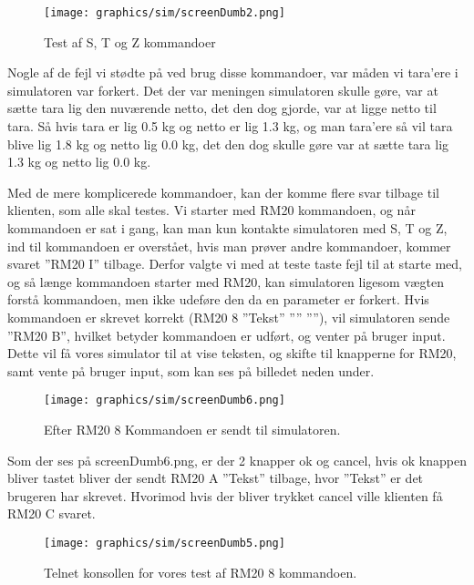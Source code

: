 \documentclass[a4paper]{article}
\newenvironment{changemargin}[2]{%
\begin{list}{}{%
\setlength{\topsep}{0pt}%
\setlength{\leftmargin}{#1}%
\setlength{\rightmargin}{#2}%
\setlength{\listparindent}{\parindent}%
\setlength{\itemindent}{\parindent}%
\setlength{\parsep}{\parskip}%
}%
\item[]}{\end{list}}
\begin{document}
\begin{figure}[h!]
\begin{changemargin}{-1cm}{}
  \centering
  \texttt{[image: graphics/sim/screenDumb2.png]}
  \caption{Test af S, T og Z kommandoer}
\end{changemargin}
\end{figure}

Nogle af de fejl vi stødte på ved brug disse kommandoer, var måden vi tara’ere i simulatoren var forkert. Det der var meningen simulatoren skulle gøre, var at sætte tara lig den nuværende netto, det den dog gjorde, var at ligge netto til tara. Så hvis tara er lig 0.5 kg og netto er lig 1.3 kg, og man tara’ere så vil tara blive lig 1.8 kg og netto lig 0.0 kg, det den dog skulle gøre var at sætte tara lig 1.3 kg og netto lig 0.0 kg.

Med de mere komplicerede kommandoer, kan der komme flere svar tilbage til klienten, som alle skal testes. Vi starter med RM20 kommandoen, og når kommandoen er sat i gang, kan man kun kontakte simulatoren med S, T og Z, ind til kommandoen er overstået, hvis man prøver andre kommandoer, kommer svaret ”RM20 I” tilbage. Derfor valgte vi med at teste taste fejl til at starte med, og så længe kommandoen starter med RM20, kan simulatoren ligesom vægten forstå kommandoen, men ikke udeføre den da en parameter er forkert. Hvis kommandoen er skrevet korrekt (RM20 8 ”Tekst” ”” ””), vil simulatoren sende ”RM20 B”, hvilket betyder kommandoen er udført, og venter på bruger input. Dette vil få vores simulator til at vise teksten, og skifte til knapperne for RM20, samt vente på bruger input, som kan ses på billedet neden under.

\begin{figure}[H]
\begin{changemargin}{-1.3cm}{}
  \centering
  \texttt{[image: graphics/sim/screenDumb6.png]}
  \caption{Efter RM20 8 Kommandoen er sendt til simulatoren.}
\end{changemargin}
\end{figure}

Som der ses på screenDumb6.png, er der 2 knapper ok og cancel, hvis ok knappen bliver tastet bliver der sendt RM20 A ”Tekst” tilbage, hvor ”Tekst” er det brugeren har skrevet. Hvorimod hvis der bliver trykket cancel ville klienten få RM20 C svaret.

\begin{figure}[H]
\begin{changemargin}{-1cm}{}
  \centering
  \texttt{[image: graphics/sim/screenDumb5.png]}
  \caption{Telnet konsollen for vores test af RM20 8 kommandoen.}
\end{changemargin}
\end{figure}
\end{document}
